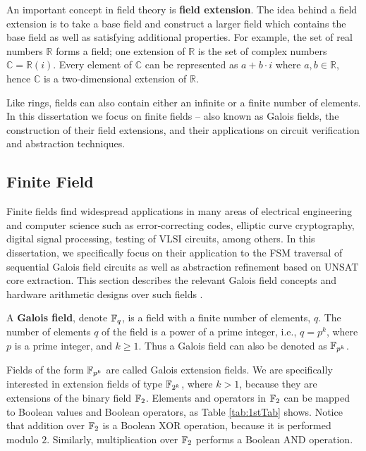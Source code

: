 An important concept in field theory is {\bf field extension}. The idea behind a
field extension is to take a base field and construct a larger field which 
contains the base field as well as satisfying additional properties. For example,
the set of real numbers $\mathbb{R}$ forms a field; one extension of 
$\mathbb{R}$ is the set of complex numbers $\mathbb{C}=\mathbb{R}(i)$. Every
element of $\mathbb{C}$ can be represented as $a+b\cdot i$ where $a,b \in \mathbb{R}$,
hence $\mathbb{C}$ is a two-dimensional extension of $\mathbb{R}$.

Like rings, fields can also contain either an infinite or a finite number of 
elements. 
In this dissertation we focus on finite fields -- also known as Galois fields, 
the construction of their field extensions, and their applications on circuit verification and abstraction techniques.

\subsection{Finite Field}
Finite fields find widespread applications in 
many areas of electrical engineering and computer science such as error-correcting
codes, elliptic curve cryptography, digital signal processing, 
testing of VLSI circuits, among others.
In this dissertation, we specifically focus on their application to 
the FSM traversal of sequential Galois field circuits as well as abstraction refinement based on UNSAT core extraction.
This section describes the relevant Galois field concepts
\cite{galois_field:mceliece,ftheory:2006,ff:1997}
and hardware arithmetic designs over such fields \cite{mastro:1989,PT:1985,acar:1998,wu:2002,Knezevic:2008}. 


\begin{Definition} 
A {\bf Galois field}, denote ${\mathbb{F}}_{q}$, is a field with a finite
number of elements, $q$. The number of elements $q$ of the field is
a power of a prime integer, i.e., $q = p^k$, where $p$ is a prime
integer, and $k \geq 1$. Thus a Galois field can also be denoted as 
${\mathbb{F}}_{p^{k}}$.
\end{Definition}

Fields of the form ${\mathbb{F}}_{p^{k}}$ are called Galois extension fields.
We are specifically interested in extension fields of type 
${\mathbb{F}}_{2^k}$, where $k > 1$, because they are extensions of the binary
field ${\mathbb{F}}_2$. Elements and operators in ${\mathbb{F}}_2$ can be mapped to 
Boolean values and Boolean operators, as Table \ref{tab:1stTab} shows.
Notice that addition over ${\mathbb{F}}_2$ is a Boolean {\sc XOR} operation, 
because it is performed modulo $2$.
Similarly, multiplication over ${\mathbb{F}}_2$ performs a Boolean {\sc AND} operation.

